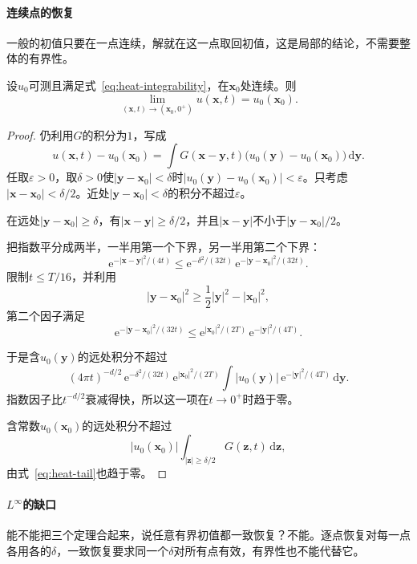 \paragraph{连续点的恢复}
一般的初值只要在一点连续，解就在这一点取回初值，这是局部的结论，不需要整体的有界性。

\begin{theorem}[连续点的恢复]
\label{thm:heat-pointwise-recovery}
设$u_0$可测且满足式~\eqref{eq:heat-integrability}，在$\bm{x}_0$处连续。则
\begin{equation}
 \lim_{(\bm{x},t)\to(\bm{x}_0,0^+)}u(\bm{x},t)=u_0(\bm{x}_0) .
 \label{eq:heat-pointwise-recovery}
\end{equation}
\end{theorem}

\begin{proof}
仍利用$G$的积分为$1$，写成
\[
 u(\bm{x},t)-u_0(\bm{x}_0)=\int G(\bm{x}-\bm{y},t)\bigl(u_0(\bm{y})-u_0(\bm{x}_0)\bigr)\,\mathrm{d}\bm{y} .
\]
任取$\varepsilon>0$，取$\delta>0$使$\lvert\bm{y}-\bm{x}_0\rvert<\delta$时$\lvert u_0(\bm{y})-u_0(\bm{x}_0)\rvert<\varepsilon$。只考虑$\lvert\bm{x}-\bm{x}_0\rvert<\delta/2$。近处$\lvert\bm{y}-\bm{x}_0\rvert<\delta$的积分不超过$\varepsilon$。

在远处$\lvert\bm{y}-\bm{x}_0\rvert\geq\delta$，有$\lvert\bm{x}-\bm{y}\rvert\geq\delta/2$，并且$\lvert\bm{x}-\bm{y}\rvert$不小于$\lvert\bm{y}-\bm{x}_0\rvert/2$。

把指数平分成两半，一半用第一个下界，另一半用第二个下界：
\[
 \mathrm{e}^{-\lvert\bm{x}-\bm{y}\rvert^2/(4t)}\leq\mathrm{e}^{-\delta^2/(32t)}\,\mathrm{e}^{-\lvert\bm{y}-\bm{x}_0\rvert^2/(32t)} .
\]
限制$t\leq T/16$，并利用
\[
 \lvert\bm{y}-\bm{x}_0\rvert^2\geq\frac12\lvert\bm{y}\rvert^2-\lvert\bm{x}_0\rvert^2 ,
\]
第二个因子满足
\[
 \mathrm{e}^{-\lvert\bm{y}-\bm{x}_0\rvert^2/(32t)}\leq\mathrm{e}^{\lvert\bm{x}_0\rvert^2/(2T)}\,\mathrm{e}^{-\lvert\bm{y}\rvert^2/(4T)} .
\]

于是含$u_0(\bm{y})$的远处积分不超过
\[
 (4\pi t)^{-d/2}\,\mathrm{e}^{-\delta^2/(32t)}\,\mathrm{e}^{\lvert\bm{x}_0\rvert^2/(2T)}\int\lvert u_0(\bm{y})\rvert\,\mathrm{e}^{-\lvert\bm{y}\rvert^2/(4T)}\,\mathrm{d}\bm{y} .
\]
指数因子比$t^{-d/2}$衰减得快，所以这一项在$t\to0^+$时趋于零。

含常数$u_0(\bm{x}_0)$的远处积分不超过
\[
 \lvert u_0(\bm{x}_0)\rvert\int_{\lvert\bm{z}\rvert\geq\delta/2}G(\bm{z},t)\,\mathrm{d}\bm{z} ,
\]
由式~\eqref{eq:heat-tail}也趋于零。
\end{proof}

\paragraph{$L^\infty$的缺口}
能不能把三个定理合起来，说任意有界初值都一致恢复？不能。逐点恢复对每一点各用各的$\delta$，一致恢复要求同一个$\delta$对所有点有效，有界性也不能代替它。

